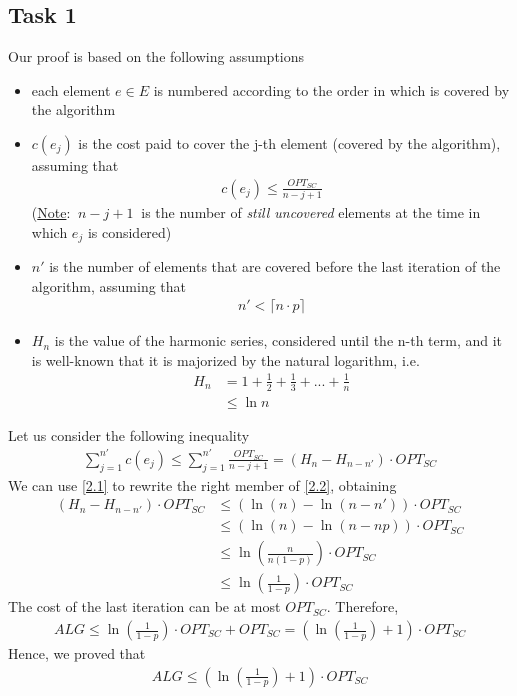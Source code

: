 \documentclass[a4paper,11pt]{article}
\begin{document}
\subsection{Task 1}
Our proof is based on the following assumptions
\begin{itemize}
	\item each element $e \in E$ is numbered according to the order in which is covered by the algorithm
	
	\item $c(e_j)$ is the cost paid to cover the j-th element (covered by the algorithm), assuming that
	\begin{align*}
	c(e_j) \leq \frac{OPT_{SC}}{n-j+1}
	\end{align*}
	(\underline{Note}: $\ n-j+1 \ $ is the number of \textit{still uncovered} elements at the time in which $e_j$ is considered)
	
	\item $n'$ is the number of elements that are covered  before the last iteration of the algorithm, assuming that
	\begin{align*}
	n' < \lceil n\cdot p \rceil
	\end{align*}
	
	\item $H_n$ is the value of the harmonic series, considered until the n-th term, and it is well-known that it is majorized by the natural logarithm, i.e.
	\begin{align}
	H_n &= 1 + \frac{1}{2} + \frac{1}{3}+...+\frac{1}{n} \nonumber\\ &\leq \ln n \label{2.1}
	\end{align}
	
\end{itemize}
Let us consider the following inequality
\begin{align}
\sum_{j=1}^{n'} c(e_j) \leq \sum_{j=1}^{n'}\frac{OPT_{SC}}{n-j+1} = (H_n - H_{n - n'}) \cdot OPT_{SC} \label{2.2}
\end{align}
We can use \ref{2.1} to rewrite the right member of \ref{2.2}, obtaining
\begin{align*}
(H_n - H_{n-n'}) \cdot OPT_{SC} &\leq (\ln(n) - \ln(n - n')) \cdot OPT_{SC}\\ 
&\leq (\ln(n) -\ln(n - np)) \cdot OPT_{SC}\\ 
&\leq \ln\left(\frac{n}{n(1-p)}\right)\cdot OPT_{SC}\\
&\leq \ln\left(\frac{1}{1-p}\right)\cdot OPT_{SC}
\end{align*}
The cost of the last iteration can be at most $OPT_{SC}$. Therefore,
\begin{align*}
ALG \leq \ln\left(\frac{1}{1-p}\right)\cdot OPT_{SC} + OPT_{SC} = \left(\ln\left(\frac{1}{1-p}\right)+1\right) \cdot OPT_{SC}
\end{align*}
Hence, we proved that
\begin{align*}
ALG \leq \left(\ln\left(\frac{1}{1-p}\right) +1\right) \cdot OPT_{SC}
\end{align*}
\end{document}
